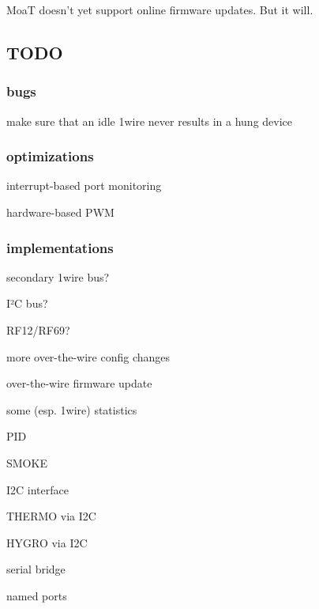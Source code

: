 Moa\-T doesn't yet support online firmware updates. But it will.

\subsection*{T\-O\-D\-O}

\subsubsection*{bugs}


\begin{DoxyItemize}
\item make sure that an idle 1wire never results in a hung device
\end{DoxyItemize}

\subsubsection*{optimizations}


\begin{DoxyItemize}
\item interrupt-\/based port monitoring
\item hardware-\/based P\-W\-M
\end{DoxyItemize}

\subsubsection*{implementations}


\begin{DoxyItemize}
\item secondary 1wire bus?
\item I²\-C bus?
\item R\-F12/\-R\-F69?
\item more over-\/the-\/wire config changes
\item over-\/the-\/wire firmware update
\item some (esp. 1wire) statistics
\item P\-I\-D
\item S\-M\-O\-K\-E
\item I2\-C interface
\item T\-H\-E\-R\-M\-O via I2\-C
\item H\-Y\-G\-R\-O via I2\-C
\item serial bridge
\item named ports 
\end{DoxyItemize}
